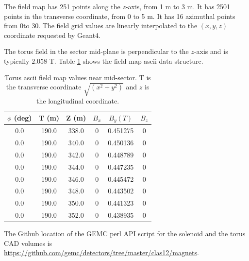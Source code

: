 The field map has 251 points along the $z$-axis, from 1 m to 3 m. It has 2501 points in the transverse coordinate, from 0 to 5 m.
It has 16 azimuthal points from 0\mdeg to 30\mdeg. The field grid values are linearly interpolated to the $(x,y,z)$
coordinate requested by Geant4.

The torus field in the sector mid-plane is perpendicular to the $z$-axis and is typically $2.058$ T.
Table \ref{tab:torMap} shows the field map ascii data structure.

\begin{table}[h]
	\begin{center}
		\begin{tabular}{| c | c | c | c | c | c | }
         $\phi$ (deg) & T (m)    & Z (m)    &  $B_x$  &    $B_y (T)$    & $B_z$\\
			\hline
          0.0         &  190.0   &  338.0   &  0       &     0.451275 &  0 \\
          0.0         &  190.0   &  340.0   &  0       &     0.450136 &  0 \\
          0.0         &  190.0   &  342.0   &  0       &     0.448789 &  0 \\
          0.0         &  190.0   &  344.0   &  0       &     0.447235 &  0 \\
          0.0         &  190.0   &  346.0   &  0       &     0.445472 &  0 \\
          0.0         &  190.0   &  348.0   &  0       &     0.443502 &  0 \\
          0.0         &  190.0   &  350.0   &  0       &     0.441323 &  0 \\
          0.0         &  190.0   &  352.0   &  0       &     0.438935 &  0 \\
		\end{tabular}
	\end{center}
	\caption{Torus ascii field map values near mid-sector. T is the transverse coordinate $\sqrt{(x^2+y^2)}$ and
             $z$ is the longitudinal coordinate.}
 	\label{tab:torMap}
\end{table}


The Github location of the GEMC perl API script for the solenoid and the torus CAD volumes is \url{https://github.com/gemc/detectors/tree/master/clas12/magnets}.

